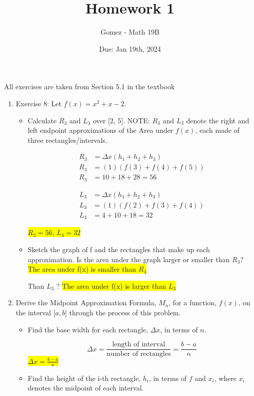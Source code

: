 \documentclass[11pt]{article}
\title{Homework 1}
\author{Gomez - Math 19B}
\date{Due: Jan 19th, 2024}
\newcommand{\bmp}[1]{\begin{minipage}{#1\textwidth}}
\newcommand{\emp}{\end{minipage}}
\begin{document}
\maketitle

\noindent 
\normalsize
All exercises are taken from Section 5.1 in the textbook

\begin{enumerate}
\item 
Exercise 8:
Let $f(x) = x^2 + x - 2$.
\begin{itemize}
\item Calculate $R_3$ and $L_3$ over [2, 5]. NOTE: $R_3$ and $L_3$ denote the right and left endpoint approximations of the Area under $f(x)$, each made of three rectangles/intervals. 

\bmp{.45}
\begin{align*}
    R_3 &= \Delta x (h_1 + h_2 + h_3) \\
    R_3 &= (1)(f(3) + f(4) + f(5)) \\
    R_3 &= 10 + 18 + 28 = 56
\end{align*}
\emp
\bmp{.45}
\begin{align*}
    L_3 &= \Delta x (h_1 + h_2 + h_3) \\ 
    L_3 &= (1)(f(2) + f(3) + f(4)) \\ 
    L_3 &= 4 + 10 + 18 = 32
\end{align*}
\emp

\colorbox{yellow}{$R_3 = 56$, $L_3 = 32$}
\item Sketch the graph of f and the rectangles that make up each approximation. Is the area under the graph larger or smaller than $R_3$? \colorbox{yellow}{The area under f(x) is smaller than $R_3$}

Than $L_3$ ? \colorbox{yellow}{The area under f(x) is larger than $L_3$}
\end{itemize}

\item 
Derive the Midpoint Approximation Formula, $M_n$, for a function, $f(x)$, on the interval [$a, b$] through the process of this problem. 
\begin{itemize}
    \item Find the base width for each rectangle, $\Delta x$, in terms of $n$.

    \[
    \Delta x = \frac{\text{length of interval}}{\text{number of rectangles}} = \frac{b - a}{n}
    \]
    \colorbox{yellow}{$\Delta x = \frac{b-a}{n}$}

    \item Find the height of the i-th rectangle, $h_i$, in terms of $f$ and $x_i$, where $x_i$ denotes the midpoint of each interval.


\end{itemize}
\end{enumerate}
\end{document}
